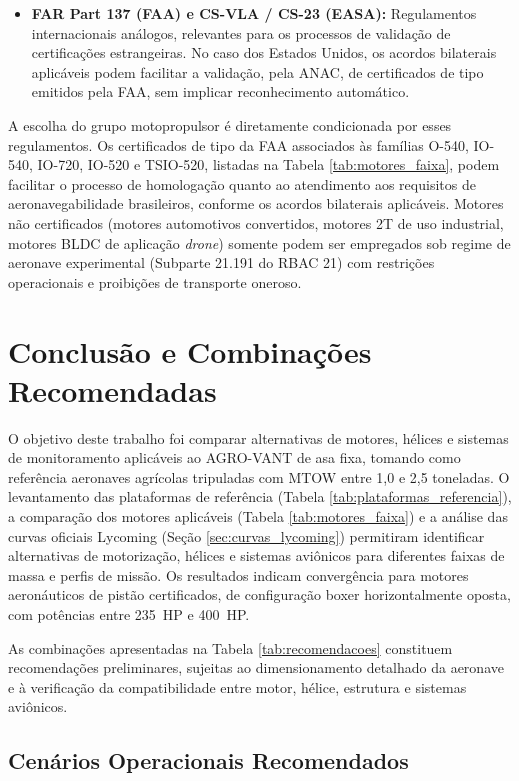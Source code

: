 \documentclass[a4paper,12pt]{article}
\begin{document}
\begin{itemize}
    \item \textbf{FAR Part 137 (FAA) e CS-VLA / CS-23 (EASA):} Regulamentos internacionais análogos, relevantes para os processos de validação de certificações estrangeiras. No caso dos Estados Unidos, os acordos bilaterais aplicáveis podem facilitar a validação, pela ANAC, de certificados de tipo emitidos pela FAA, sem implicar reconhecimento automático.
\end{itemize}

A escolha do grupo motopropulsor é diretamente condicionada por esses regulamentos. Os certificados de tipo da FAA associados às famílias O-540, IO-540, IO-720, IO-520 e TSIO-520, listadas na Tabela \ref{tab:motores_faixa}, podem facilitar o processo de homologação quanto ao atendimento aos requisitos de aeronavegabilidade brasileiros, conforme os acordos bilaterais aplicáveis. Motores não certificados (motores automotivos convertidos, motores 2T de uso industrial, motores BLDC de aplicação \textit{drone}) somente podem ser empregados sob regime de aeronave experimental (Subparte 21.191 do RBAC 21) com restrições operacionais e proibições de transporte oneroso.

\section{Conclusão e Combinações Recomendadas}

O objetivo deste trabalho foi comparar alternativas de motores, hélices e sistemas de monitoramento aplicáveis ao AGRO-VANT de asa fixa, tomando como referência aeronaves agrícolas tripuladas com MTOW entre 1{,}0 e 2{,}5 toneladas. O levantamento das plataformas de referência (Tabela \ref{tab:plataformas_referencia}), a comparação dos motores aplicáveis (Tabela \ref{tab:motores_faixa}) e a análise das curvas oficiais Lycoming (Seção \ref{sec:curvas_lycoming}) permitiram identificar alternativas de motorização, hélices e sistemas aviônicos para diferentes faixas de massa e perfis de missão. Os resultados indicam convergência para motores aeronáuticos de pistão certificados, de configuração boxer horizontalmente oposta, com potências entre \SI{235}{HP} e \SI{400}{HP}.

As combinações apresentadas na Tabela \ref{tab:recomendacoes} constituem recomendações preliminares, sujeitas ao dimensionamento detalhado da aeronave e à verificação da compatibilidade entre motor, hélice, estrutura e sistemas aviônicos.

\subsection{Cenários Operacionais Recomendados}
\end{document}
